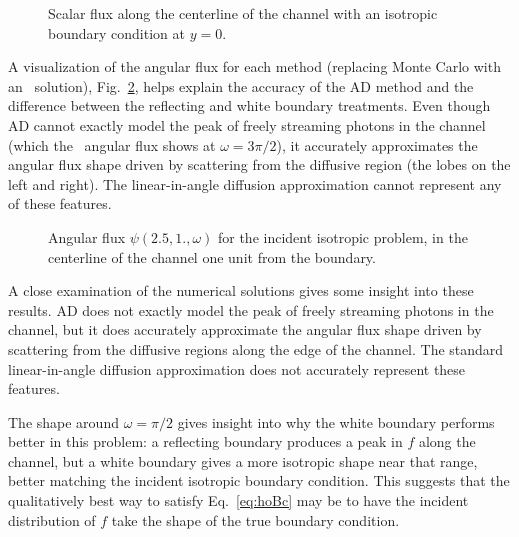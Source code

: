 \begin{figure}[htb!]
  \centering
  \hspace{-.25in}%
  
  \caption{Scalar flux along the centerline of the channel with an isotropic
  boundary condition at $y=0$.}
  \label{fig:isotropic}
\end{figure}

A visualization of the angular flux for each method (replacing Monte Carlo with
an \SN\ solution), Fig.~\ref{fig:bcChannelIsotropicAngular}, helps explain the
accuracy
of the AD method and the difference between the reflecting and white boundary
treatments. Even though AD cannot exactly model the peak of freely streaming
photons in the channel (which the \SN\ angular flux shows at $\omega=3\pi/2$),
it accurately approximates the angular flux shape driven by scattering from the
diffusive region (the lobes on the left and right).
The linear-in-angle diffusion approximation cannot represent any of these
features.  

\begin{figure}[htb]
  \centering\small
  \vspace{-.25in}%
  \hspace{-.25in}%
  
  \vspace{-.25in}%
  \caption{Angular flux $\psi(2.5, 1., \omega)$ for the incident isotropic
  problem, in the centerline of the channel one unit from the boundary.}
  \label{fig:bcChannelIsotropicAngular}
\end{figure}

A close examination of the numerical solutions gives some insight into these
results.  AD does not exactly model the peak of freely streaming
photons in the channel, but it does accurately approximate the angular flux
shape driven by scattering from the diffusive regions along the edge of the
channel. 
The standard linear-in-angle diffusion approximation does not accurately
represent these
features.

The shape around $\omega=\pi/2$ gives insight into why the white boundary
performs better in this problem: a reflecting boundary produces a peak in $f$
along the channel, but a white boundary gives a more isotropic shape near that
range, better matching the incident isotropic boundary condition. This suggests
that the qualitatively best way to satisfy Eq.~\eqref{eq:hoBc} may be
to have the incident distribution of $f$ take the shape of the true boundary
condition.

